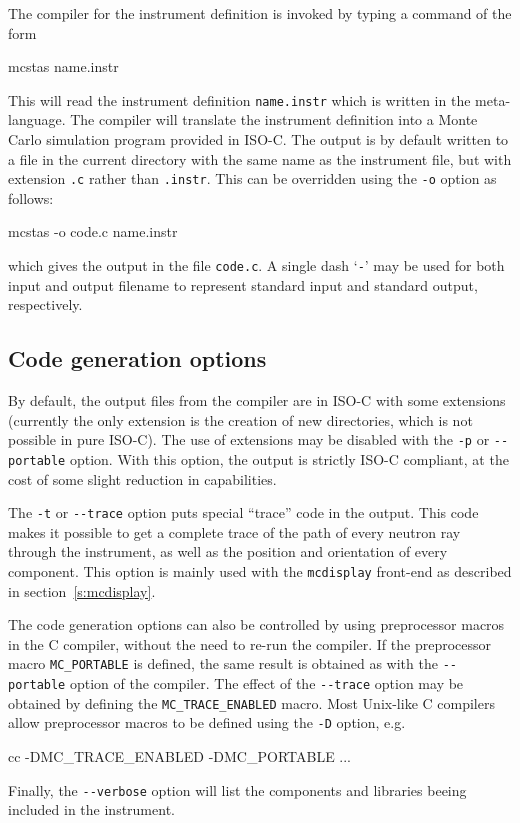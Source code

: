 The compiler for the \MCS{} instrument definition
is invoked by typing a command of the form
\begin{bash}
    mcstas name.instr
\end{bash}
This will read the instrument definition \verb+name.instr+ which is
written in the \MCS meta-language. The compiler will translate the
instrument definition into a Monte Carlo simulation program provided in
ISO-C. The output is by default written to a file in the current
directory with the same name as the instrument file, but with extension
\verb+.c+ rather than \verb+.instr+. This can be overridden using the
\verb+-o+ option as follows:
\begin{bash}
    mcstas -o code.c name.instr
\end{bash}
which gives the output in the file \verb+code.c+.
A single dash `\verb+-+' may be used for both input and output filename
to represent standard input and standard output, respectively.


\subsection{Code generation options}

By default, the output files from the \MCS compiler are in ISO-C with
some extensions (currently the only extension is the creation of new
directories, which is not possible in pure ISO-C). The use of
extensions may be disabled with the \verb+-p+ or \verb+--portable+
option. With this option, the output is strictly ISO-C compliant, at
the cost of some slight reduction in capabilities.

The \verb+-t+ or \verb+--trace+ option puts special ``trace'' code in
the output. This code makes it possible to get a complete trace of the
path of every neutron ray through the instrument, as well as the position
and orientation of every component. This option is mainly used with the
\verb+mcdisplay+ front-end as described in section~\ref{s:mcdisplay}.

The code generation options can also be controlled by using preprocessor
macros in the C compiler, without the need to re-run the \MCS
compiler. If the preprocessor macro \verb+MC_PORTABLE+ is defined, the
same result is obtained as with the \verb+--portable+ option of the
\MCS compiler. The effect of the \verb+--trace+ option may be obtained
by defining the \verb+MC_TRACE_ENABLED+ macro. Most Unix-like C
compilers allow preprocessor macros to be defined using the \verb+-D+
option, e.g.
\begin{bash}
    cc -DMC_TRACE_ENABLED -DMC_PORTABLE ...
\end{bash}
Finally, the \verb+--verbose+ option will list the components and libraries beeing
included in the instrument.

